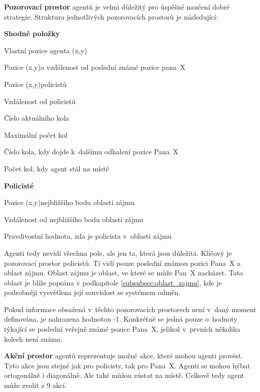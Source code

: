 \bigskip
\textbf{Pozorovací prostor} agentů je velmi důležitý pro úspěšné naučení dobré strategie.
Struktura jednotlivých pozorovacích prostorů je následující:

\begin{myitemize}
  \item \textbf{Shodné položky}
    \begin{myitemize}
    \item Vlastní pozice agenta (x,y)
    \item Pozice (x,y)a vzdálenost od poslední známé pozice pana~X
    \item Pozice (x,y)policistů
    \item Vzdálenost od  policistů
    \item Číslo aktuálního kola
    \item Maximální počet kol
    \item Číslo kola, kdy dojde k~dalšímu odhalení pozice Pana~X
    \item Počet kol, kdy agent stál na místě
  \end{myitemize}
  \item \textbf{Policisté}
    \begin{myitemize}
    \item Pozice (x,y)nejbližšího bodu oblasti zájmu
    \item Vzdálenost od nejbližšího bodu oblasti zájmu
    \item Pravdivostní hodnota, zda je policista v~oblasti zájmu
  \end{myitemize}
\end{myitemize}

Agenti tedy nevidí všechna pole, ale jen ta, která jsou důležitá.
Klíčový je pozorovací prostor policistů.
Ti vidí pouze poslední známou pozici Pana~X a oblast zájmu.
Oblast zájmu je oblast, ve které se může Pan~X nacházet.
Tato oblast je blíže popsána v podkapitole  \ref{subsubsec:oblast_zajmu}, kde je podrobněji vysvětlena její souvislost se systémem odměn.

Pokud informace obsažená v~těchto pozorovacích prostorech není v~daný moment definována, je nahrazena hodnotou -1.
Konkrétně se jedná pouze o~hodnoty týkající se poslední veřejně známé pozice Pana~X, jelikož v~prvních několika kolech není známa.

\bigskip

\textbf{Akční prostor} agentů reprezentuje možné akce, které mohou agenti provést.
Tyto akce jsou stejné jak pro policisty, tak pro Pana~X\@.
Agenti se mohou hýbat ortogonálně i diagonálně.
Ale také můžou zůstat na místě.
Celkově tedy agent může zvolit z 9 akcí.


